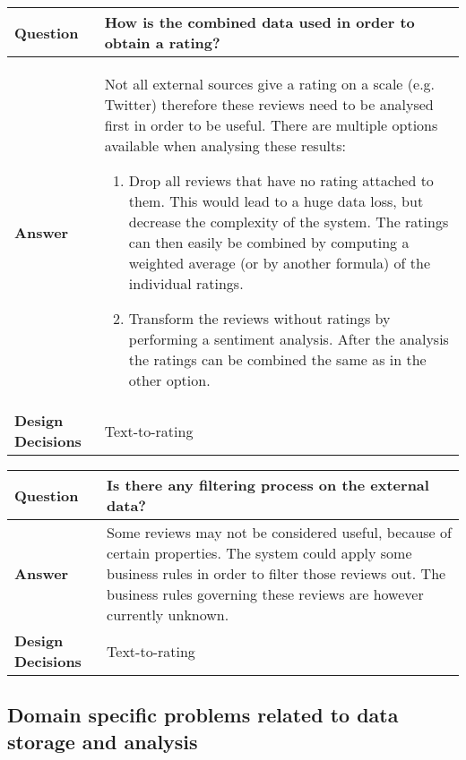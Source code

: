 \begin{longtable}{| l |  p{12cm} |}
\hline
\textbf{Question} & \textbf{How is the combined data used in order to obtain a rating?}  \\ \hline
\textbf{Answer} &
	Not all external sources give a rating on a scale (e.g. Twitter) therefore these reviews need to be analysed first in order to be useful. There are multiple options available when analysing these results:
	\begin{enumerate}
	\item Drop all reviews that have no rating attached to them. This would lead to a huge data loss, but decrease the complexity 			of the system. The ratings can then easily be combined by computing a weighted average (or by another formula) of the individual ratings.	
	\item Transform the reviews without ratings by performing a sentiment analysis. After the analysis the ratings can be combined the same as in the other option.
\end{enumerate} \\ \hline
\textbf{Design Decisions} & Text-to-rating \\ \hline
\end{longtable}

\begin{longtable}{| l |  p{12cm} |}
\hline
\textbf{Question} & \textbf{Is there any filtering process on the external data?}  \\ \hline
\textbf{Answer} &
	Some reviews may not be considered useful, because of certain properties. The system could apply some business rules in order to filter those reviews out. The business rules governing these reviews are however currently unknown.  \\ \hline
\textbf{Design Decisions} & Text-to-rating \\ \hline
\end{longtable}


\subsection{Domain specific problems related to data storage and analysis}
